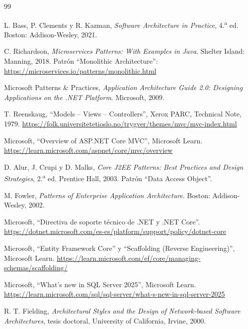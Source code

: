 \documentclass[12pt,letterpaper]{article}
\begin{document}
\begin{thebibliography}{99}

 L. Bass, P. Clements y R. Kazman, \emph{Software Architecture in Practice},
  4.\textsuperscript{a} ed. Boston: Addison-Wesley, 2021.

 C. Richardson, \emph{Microservices Patterns: With Examples in Java}.
  Shelter Island: Manning, 2018. Patrón \enquote{Monolithic Architecture}:
  \url{https://microservices.io/patterns/monolithic.html}

 Microsoft Patterns \& Practices, \emph{Application Architecture Guide
  2.0: Designing Applications on the .NET Platform}. Microsoft, 2009.

 T. Reenskaug, \enquote{Models -- Views -- Controllers}, Xerox PARC,
  Technical Note, 1979. \url{https://folk.universitetetioslo.no/trygver/themes/mvc/mvc-index.html}

 Microsoft, \enquote{Overview of ASP.NET Core MVC}, Microsoft Learn.
  \url{https://learn.microsoft.com/aspnet/core/mvc/overview}

 D. Alur, J. Crupi y D. Malks, \emph{Core J2EE Patterns: Best Practices
  and Design Strategies}, 2.\textsuperscript{a} ed. Prentice Hall, 2003. Patrón
  \enquote{Data Access Object}.

 M. Fowler, \emph{Patterns of Enterprise Application Architecture}.
  Boston: Addison-Wesley, 2002.

 Microsoft, \enquote{Directiva de soporte técnico de .NET y .NET
  Core}. \url{https://dotnet.microsoft.com/es-es/platform/support/policy/dotnet-core}

 Microsoft, \enquote{Entity Framework Core} y \enquote{Scaffolding
  (Reverse Engineering)}, Microsoft Learn.
  \url{https://learn.microsoft.com/ef/core/managing-schemas/scaffolding/}

 Microsoft, \enquote{What's new in SQL Server 2025}, Microsoft Learn.
  \url{https://learn.microsoft.com/sql/sql-server/what-s-new-in-sql-server-2025}

 R. T. Fielding, \emph{Architectural Styles and the Design of
  Network-based Software Architectures}, tesis doctoral, University of California, Irvine,
  2000.


\end{thebibliography}
\end{document}

